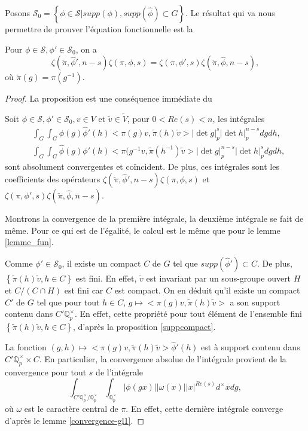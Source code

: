 Posons $\mathcal{S}_0=\left\lbrace \phi \in \mathcal{S}| supp(\phi), supp(\hat{\phi}) \subset G \right\rbrace$. Le résultat qui va nous permettre de prouver l'équation fonctionnelle est la
\begin{proposition}
\label{pre-eq-func}
Pour $\phi \in \mathcal{S}, \phi' \in \mathcal{S}_0$, on a
\begin{equation}
\zeta(\check{\pi}, \hat{\phi}', n-s)\zeta(\pi,\phi,s) = \zeta(\pi, \phi',s)\zeta(\check{\pi}, \hat{\phi}, n-s),
\end{equation}
où $\check{\pi}(g) = \pi(g^{-1})$.
\end{proposition}

\begin{proof}
La proposition est une conséquence immédiate du
\begin{lemme}
Soit $\phi \in \mathcal{S}, \phi' \in \mathcal{S}_0, v \in V$ et $\tilde{v} \in \tilde{V}$, pour $0 < Re(s) < n$, les intégrales
\begin{align}
&\int_G \int_G \phi(g)\hat{\phi}'(h)<\pi(g)v,\tilde{\pi}(h)\tilde{v}>|\det g|_p^s|\det h|_p^{n-s}dg dh, \\
&\int_G \int_G \hat{\phi}(g)\phi'(h)<\pi(g^{-1}v,\tilde{\pi}(h^{-1})\tilde{v}>|\det g|_p^{n-s}|\det h|_p^s dg dh,
\end{align}
sont absolument convergentes et coïncident. De plus, ces intégrales sont les coefficients des opérateurs $\zeta(\check{\pi}, \hat{\phi}', n-s)\zeta(\pi,\phi,s)$ et $\zeta(\pi, \phi',s)\zeta(\check{\pi}, \hat{\phi}, n-s)$.
\end{lemme}

Montrons la convergence de la première intégrale, la deuxième intégrale se fait de même. Pour ce qui est de l'égalité, le calcul est le même que pour le lemme \ref{lemme_fun}.

Comme $\phi' \in \mathcal{S}_0$, il existe un compact $C$ de $G$ tel que $supp(\hat{\phi}') \subset C$. De plus, $\left\lbrace \tilde{\pi}(h)\tilde{v}, h \in C \right\rbrace$ est fini. En effet, $\tilde{v}$ est invariant par un sous-groupe ouvert $H$ et $C/(C \cap H)$ est fini car $C$ est compact. On en déduit qu'il existe un compact $C'$ de $G$ tel que pour tout $h \in C$, $g \mapsto <\pi(g)v, \tilde{\pi}(h)\tilde{v}>$ a son support contenu dans $C' \mathbb{Q}_p^\times$. En effet, cette propriété pour tout élément de l'ensemble fini $\left\lbrace \tilde{\pi}(h)\tilde{v}, h \in C \right\rbrace$, d'après la proposition \ref{suppcompact}.

La fonction $(g,h) \mapsto <\pi(g)v,\tilde{\pi}(h)\tilde{v}>\hat{\phi}'(h)$ est à support contenu dans $C'\mathbb{Q}_p^\times \times C$. En particulier, la convergence absolue de l'intégrale provient de la convergence pour tout $s$ de l'intégrale
\begin{equation}
\int_{C'\mathbb{Q}_p^\times/\mathbb{Q}_p^\times} \int_{\mathbb{Q}_p^\times} |\phi(gx)||\omega(x)||x|^{Re(s)}d^\times x dg,
\end{equation}
où $\omega$ est le caractère central de $\pi$. En effet, cette dernière intégrale converge d'après le lemme \ref{convergence-gl1}.
\end{proof}


